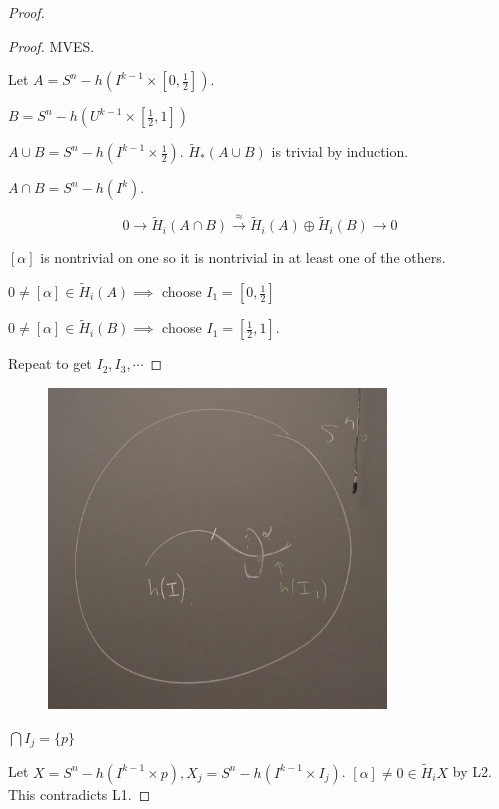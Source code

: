 \documentclass{article}
\theoremstyle{definition}
\begin{document}
\begin{proof}
        \begin{proof}
            MVES.
            
            Let \(A = S^n - h(I^{k-1} \times [0,\frac{1}{2}])\).

            \(B = S^n - h(U^{k-1} \times [\frac{1}{2}, 1])\)
            
            \(A\cup B = S^n - h(I^{k-1} \times \frac{1}{2})\). \(\widetilde{H}_{\ast} (A\cup B)\)  is trivial by induction.
            
            \(A\cap B = S^n - h(I^k)\).

            \[
                0 \to \widetilde{H}_i(A\cap B) \xrightarrow{\approx} \widetilde{H}_i (A) \oplus \widetilde{H}_i(B) \to 0
            \]

            \([\alpha]\) is nontrivial on one so it is nontrivial in at least one of the others.

            \(0\neq [\alpha] \in \widetilde{H}_i(A) \implies\) choose \(I_1 = [0,\frac{1}{2}]\)

            \(0\neq [\alpha] \in \widetilde{H}_i(B) \implies\) choose \(I_1 = [\frac{1}{2}, 1]\).
            
            Repeat to get \(I_2, I_3, \cdots\) 
        \end{proof}


        \begin{figure}[H]
            \centering
            \includegraphics[width=0.8\textwidth]{img/intervals}
        \end{figure}

        \(\bigcap I_j = \{ p \}\) 

        Let \(X = S^n - h(I^{k-1} \times p), X_j = S^n - h(I^{k-1} \times I_j)\). \([\alpha] \neq 0 \in \widetilde{H}_i X\) by L2. This contradicts L1.

    \end{proof}
\end{document}

